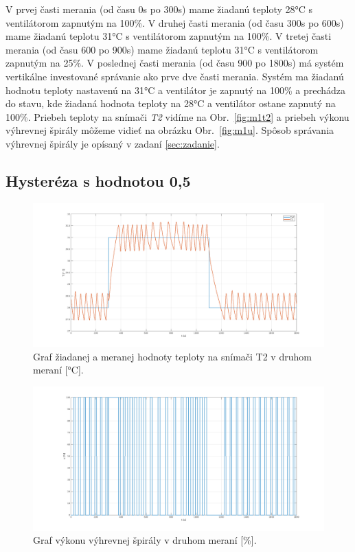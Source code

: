 \documentclass{article}
\begin{document}
V prvej časti merania (od času 0s po 300s) mame žiadanú teploty 28°C s ventilátorom zapnutým na 100\%.
V druhej časti merania (od času 300s po 600s) mame žiadanú teplotu 31°C s ventilátorom zapnutým na 100\%.
V tretej časti merania (od času 600 po 900s) mame žiadanú teplotu 31°C s ventilátorom zapnutým na 25\%.
V poslednej časti merania (od času 900 po 1800s) má systém vertikálne investované správanie ako prve
dve časti merania. Systém ma žiadanú hodnotu teploty nastavenú na 31°C a ventilátor je zapnutý na 100\%
a prechádza do stavu, kde žiadaná hodnota teploty na 28°C a ventilátor ostane zapnutý na 100\%.
Priebeh teploty na snímači \textit{T2} vidíme na Obr.~\ref{fig:m1t2} a priebeh výkonu výhrevnej špirály
môžeme vidieť na obrázku Obr.~\ref{fig:m1u}. Spôsob správania výhrevnej špirály je opísaný v zadaní
\ref{sec:zadanie}.

\clearpage

\subsection{Hysteréza s hodnotou 0,5}
\label{sec:meranie2}

\begin{figure}[!htbp]
	\begin{center}
		\includegraphics[width=\textwidth]{./include/m2T2.png}
	\end{center}
	\caption{Graf žiadanej a meranej hodnoty teploty na snímači T2 v druhom meraní [°C].}
	\label{fig:m2t2}
\end{figure}

\clearpage

\begin{figure}[!htbp]
	\begin{center}
		\includegraphics[width=\textwidth]{./include/m2u.png}
	\end{center}
	\caption{Graf výkonu výhrevnej špirály v druhom meraní [\%].}
	\label{fig:m2u}
\end{figure}
\end{document}
